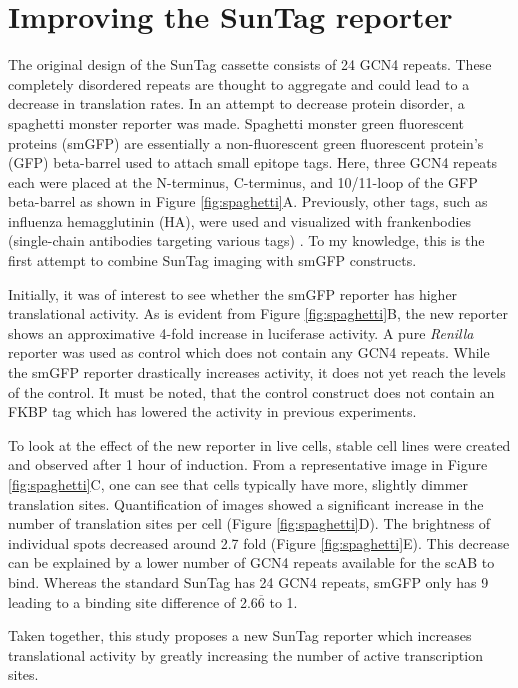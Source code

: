 \section{Improving the SunTag reporter}

The original design of the SunTag cassette consists of 24 GCN4 repeats.
These completely disordered repeats are thought to aggregate and could lead to a decrease in translation rates.
In an attempt to decrease protein disorder, a spaghetti monster reporter was made.
Spaghetti monster green fluorescent proteins (smGFP) are essentially a non-fluorescent green
    fluorescent protein's (GFP) beta-barrel used to attach small epitope tags.
Here, three GCN4 repeats each were placed at the N-terminus, C-terminus, and 10/11-loop of the GFP
    beta-barrel as shown in Figure \ref{fig:spaghetti}A.
Previously, other tags, such as influenza hemagglutinin (HA), were used and visualized with
    frankenbodies (single-chain antibodies targeting various tags) \cite{zhao_genetically_2019}.
To my knowledge, this is the first attempt to combine SunTag imaging with smGFP constructs.

Initially, it was of interest to see whether the smGFP reporter has higher translational activity.
As is evident from Figure \ref{fig:spaghetti}B, the new reporter shows an approximative 4-fold
    increase in luciferase activity.
A pure \textit{Renilla} reporter was used as control which does not contain any GCN4 repeats.
While the smGFP reporter drastically increases activity, it does not yet reach the levels
    of the control.
It must be noted, that the control construct does not contain an FKBP tag which has lowered
    the activity in previous experiments.

To look at the effect of the new reporter in live cells, stable cell lines were created and
    observed after 1 hour of induction.
From a representative image in Figure \ref{fig:spaghetti}C, one can see that cells typically
    have more, slightly dimmer translation sites.
Quantification of images showed a significant increase in the number of translation sites per cell (Figure \ref{fig:spaghetti}D).
The brightness of individual spots decreased around 2.7 fold (Figure \ref{fig:spaghetti}E).
This decrease can be explained by a lower number of GCN4 repeats available for the scAB to bind.
Whereas the standard SunTag has 24 GCN4 repeats, smGFP only has 9 leading to a binding site
    difference of 2.6$\overline{\mbox{6}}$ to 1.

Taken together, this study proposes a new SunTag reporter which increases translational activity
    by greatly increasing the number of active transcription sites.


